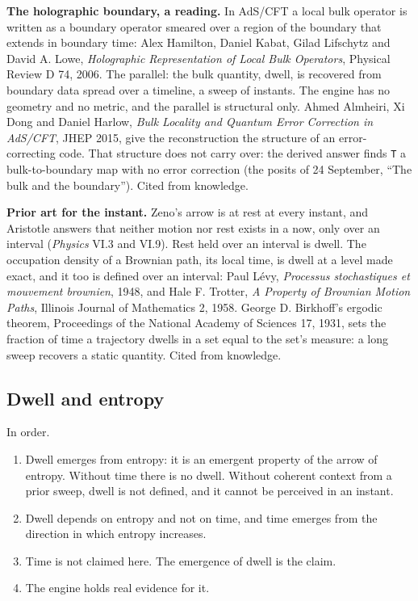 \textbf{The holographic boundary, a reading.} In AdS/CFT a local bulk operator is written as a boundary operator smeared over a region of the boundary that extends in boundary time: Alex Hamilton, Daniel Kabat, Gilad Lifschytz and David A. Lowe, \emph{Holographic Representation of Local Bulk Operators}, Physical Review D 74, 2006. The parallel: the bulk quantity, dwell, is recovered from boundary data spread over a timeline, a sweep of instants. The engine has no geometry and no metric, and the parallel is structural only. Ahmed Almheiri, Xi Dong and Daniel Harlow, \emph{Bulk Locality and Quantum Error Correction in AdS/CFT}, JHEP 2015, give the reconstruction the structure of an error-correcting code. That structure does not carry over: the derived answer finds \texttt{T} a bulk-to-boundary map with no error correction (the posits of 24 September, “The bulk and the boundary”). Cited from knowledge.

\textbf{Prior art for the instant.} Zeno's arrow is at rest at every instant, and Aristotle answers that neither motion nor rest exists in a now, only over an interval (\emph{Physics} VI.3 and VI.9). Rest held over an interval is dwell. The occupation density of a Brownian path, its local time, is dwell at a level made exact, and it too is defined over an interval: Paul Lévy, \emph{Processus stochastiques et mouvement brownien}, 1948, and Hale F. Trotter, \emph{A Property of Brownian Motion Paths}, Illinois Journal of Mathematics 2, 1958. George D. Birkhoff's ergodic theorem, Proceedings of the National Academy of Sciences 17, 1931, sets the fraction of time a trajectory dwells in a set equal to the set's measure: a long sweep recovers a static quantity. Cited from knowledge.

\subsection{\texorpdfstring{Dwell and entropy}{Dwell and entropy}}

In order.

\begin{enumerate}
\item Dwell emerges from entropy: it is an emergent property of the arrow of entropy. Without time there is no dwell. Without coherent context from a prior sweep, dwell is not defined, and it cannot be perceived in an instant.
\item Dwell depends on entropy and not on time, and time emerges from the direction in which entropy increases.
\item Time is not claimed here. The emergence of dwell is the claim.
\item The engine holds real evidence for it.
\end{enumerate}

